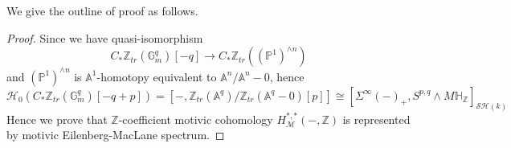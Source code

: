 \documentclass[b5paper,10pt]{article}
\begin{document}
We give the outline of proof as follows.
\begin{proof}
	Since we have quasi-isomorphism
	\[
	C_*\mathbb{Z}_{tr}(\mathbb{G}_m^q)[-q] \to C_* \mathbb{Z}_{tr}((\mathbb{P}^1)^{\wedge n})
	\]
	and $(\mathbb{P}^1)^{\wedge n}$ is $\mathbb{A}^1$-homotopy equivalent to $\mathbb{A}^n/ \mathbb{A}^n-0$, hence 
	\[
	\mathcal{H}_0(C_*\mathbb{Z}_{tr}(\mathbb{G}_m^q)[-q+p]) = [-, \mathbb{Z}_{tr}(\mathbb{A}^q)/\mathbb{Z}_{tr}(\mathbb{A}^q-0)[p]]\cong[\Sigma^{\infty}(-)_+, S^{p,q}\wedge M\mathbb{H}_\mathbb{Z}]_{\mathcal{SH}(k)}
	\]
	Hence we prove that $\mathbb{Z}$-coefficient motivic cohomology $H^{*,*}_{\mathcal{M}}(-,\mathbb{Z})$ is represented by motivic Eilenberg-MacLane spectrum.
\end{proof}


\end{document}
